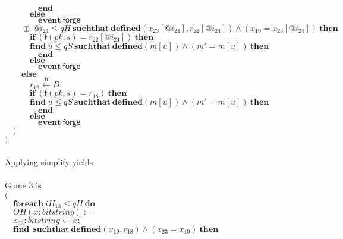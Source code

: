 \documentclass{article}
\newcommand{\store}{\leftarrow}
\newcommand{\getR}{\stackrel{R}{\store}}
\newcommand{\kw}[1]{\mathbf{#1}}
\newcommand{\kwf}[1]{\mathsf{#1}}
\newcommand{\var}[1]{\mathit{#1}}
\newcommand{\kwt}[1]{\mathit{#1}}
\newcommand{\kwp}[1]{\mathit{#1}}
\begin{document}
\begin{tabbing}
$\quad \quad \quad \quad \kw{end}$\\
$\quad \quad \quad \kw{else}$\\
$\quad \quad \quad \quad \kw{event}\ \kwf{forge}$\\
$\quad \quad \oplus\ \var{@i}_{24} \leq \kwp{qH}\ \kw{suchthat}\ \kw{defined}(\var{x}_{23}[\var{@i}_{24}], \var{r}_{22}[\var{@i}_{24}])\wedge (\var{x}_{19}  =  \var{x}_{23}[\var{@i}_{24}])\ \kw{then}$\\
$\quad \quad \quad \kw{if}\ (\kwf{f}(\var{pk}, \var{s})  =  \var{r}_{22}[\var{@i}_{24}])\ \kw{then}$\\
$\quad \quad \quad \kw{find}\ \var{u} \leq \kwp{qS}\ \kw{suchthat}\ \kw{defined}(\var{m}[\var{u}])\wedge (\var{m'}  =  \var{m}[\var{u}])\ \kw{then}$\\
$\quad \quad \quad \quad \kw{end}$\\
$\quad \quad \quad \kw{else}$\\
$\quad \quad \quad \quad \kw{event}\ \kwf{forge}$\\
$\quad \quad \kw{else}$\\
$\quad \quad \quad \var{r}_{18} \getR \kwt{D};$\\
$\quad \quad \quad \kw{if}\ (\kwf{f}(\var{pk}, \var{s})  =  \var{r}_{18})\ \kw{then}$\\
$\quad \quad \quad \kw{find}\ \var{u} \leq \kwp{qS}\ \kw{suchthat}\ \kw{defined}(\var{m}[\var{u}])\wedge (\var{m'}  =  \var{m}[\var{u}])\ \kw{then}$\\
$\quad \quad \quad \quad \kw{end}$\\
$\quad \quad \quad \kw{else}$\\
$\quad \quad \quad \quad \kw{event}\ \kwf{forge}$\\
$\quad )$\\
$)$\\
$ $\\
\\
Applying simplify yields\\
\\
Game 3 is\\
$($\\
$\quad \kw{foreach}\ \var{iH}_{13} \leq \kwp{qH}\ \kw{do}$\\
$\quad OH(\var{x}: \kwt{bitstring}) :=$\\
$\quad \var{x}_{23}: \kwt{bitstring} \store \var{x};$\\
$\quad \kw{find}\ \ \kw{suchthat}\ \kw{defined}(\var{x}_{19}, \var{r}_{18})\wedge (\var{x}_{23}  =  \var{x}_{19})\ \kw{then}$\\

\end{tabbing}
\end{document}
